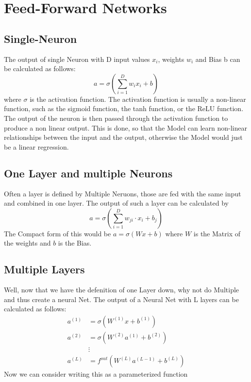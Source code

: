 \documentclass[a4paper]{article}
\begin{document}
    \section{Feed-Forward Networks}

    \subsection{Single-Neuron}

    The output of  single Neuron with D input values $x_{i}$, weights $w_{i}$ and Bias b can be calculated as follows: $$a = \sigma(\sum_{i=1}^{D} w_{i}x_{i} + b)$$ where $\sigma$ is the activation function. The activation function is usually a non-linear function, such as the sigmoid function, the tanh function, or the ReLU function. The output of the neuron is then passed through the activation function to produce a non linear output. This is done, so that the Model can learn non-linear relationships between the input and the output, otherwise the Model would just be a linear regression.

    \subsection{One Layer and multiple Neurons}
    Often a layer is defined by Multiple Neruons, those are fed with the same input and combined in one layer. The output of such a layer can be calculated by $$a = \sigma(\sum_{i=1}^{D}w_{ji} \cdot x_{i} + b_{j})$$ The Compact form of this would be $a = \sigma(Wx + b)$ where $W$ is the Matrix of the weights and $b$ is the Bias.


    \subsection{Multiple Layers}

    Well, now that we have the defenition of one Layer down, why not do Multiple and thus create a neural Net. The output of a Neural Net with L layers can be calculated as follows: \begin{align*}
        a^{(1)} &= \sigma(W^{(1)}x + b^{(1)}) \\
        a^{(2)} &= \sigma(W^{(2)}a^{(1)} + b^{(2)}) \\
        &\vdots \\
        a^{(L)} &= f^{out} (W^{(L)}a^{(L-1)} + b^{(L)})
    \end{align*}
    Now we can consider writing this as a parameterized function
  
\end{document}
